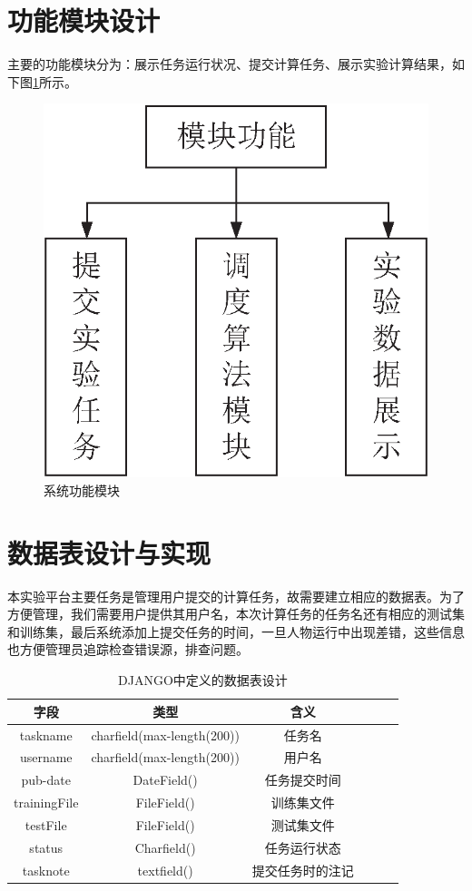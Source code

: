 \documentclass[oneside]{ZJUthesis}
\begin{document}
\section{功能模块设计}
主要的功能模块分为：展示任务运行状况、提交计算任务、展示实验计算结果，如下图\ref{fig:module}所示。
\begin{figure}[H]
\centering
\includegraphics[scale=0.5]{./Pictures/module.eps}
\caption{系统功能模块}
\label{fig:module}
\end{figure}


\section{数据表设计与实现}
本实验平台主要任务是管理用户提交的计算任务，故需要建立相应的数据表。为了方便管理，我们需要用户提供其用户名，本次计算任务的任务名还有相应的测试集和训练集，最后系统添加上提交任务的时间，一旦人物运行中出现差错，这些信息也方便管理员追踪检查错误源，排查问题。
\begin{table}[H]
\begin{center}
{
\caption{DJANGO中定义的数据表设计}}
\begin{tabular}{|c|c|c|c|c|c|}
\hline
字段& 类型&含义\\
\hline
taskname &charfield(max-length(200)) &任务名\\
\hline
username &charfield(max-length(200)) &  用户名\\
\hline
pub-date & DateField()& 任务提交时间\\
\hline
trainingFile  & FileField() &  训练集文件\\
\hline
testFile & FileField() &  测试集文件\\
\hline
status &Charfield() & 任务运行状态\\
\hline
tasknote  & textfield() & 提交任务时的注记 \\
\hline
\end{tabular}
\end{center}
\end{table}
\end{document}
